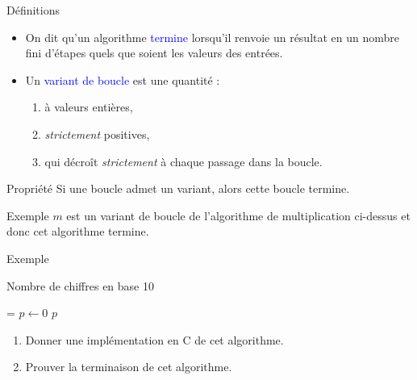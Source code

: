 \documentclass[10pt,french]{beamer}
\begin{document}
\begin{frame}[fragile]{\Ctitle}{\stitle}
	\begin{block}{Définitions}
    \begin{itemize}
        \item<2-> On dit qu'un algorithme \textcolor{blue}{termine} lorsqu'il renvoie un résultat en un nombre fini d'étapes quels que soient les valeurs des entrées.
        \item<3-> Un \textcolor{blue}{variant de boucle} est une quantité :
            \begin{enumerate}
            \item<4-> à valeurs entières,
            \item<5-> \textit{strictement} positives,
            \item<6-> qui décroît \textit{strictement} à chaque passage dans la boucle.
            \end{enumerate}
		\end{itemize}
	\end{block}
	{\begin{alertblock}{\textcolor{yellow}{\important \;} Propriété}
		Si une boucle admet un variant, alors cette boucle termine.
	\end{alertblock}}
	{
		\begin{exampleblock}{Exemple}
			$m$ est un variant de boucle de l'algorithme de multiplication ci-dessus et donc cet algorithme termine.
		\end{exampleblock}
	}
\end{frame}

\begin{frame}[fragile]{\Ctitle}{\stitle}
	\begin{exampleblock}{Exemple}
	\SetAlFnt{\small}
	\setlength{\algomargin}{8pt}
	\begin{algorithm}[H]
		\DontPrintSemicolon
		\caption{Nombre de chiffres en base 10}
		\everypar={\footnotesize \textcolor{gray}{\nl}}
		$p \leftarrow 0$\;
		\Return $p$
	  \end{algorithm}
	  \begin{enumerate}
	  \item<2-> Donner une implémentation en C de cet algorithme.
	  \item<3-> Prouver la terminaison de cet algorithme.
	  \end{enumerate}
	\end{exampleblock}
\end{frame}
\end{document}

